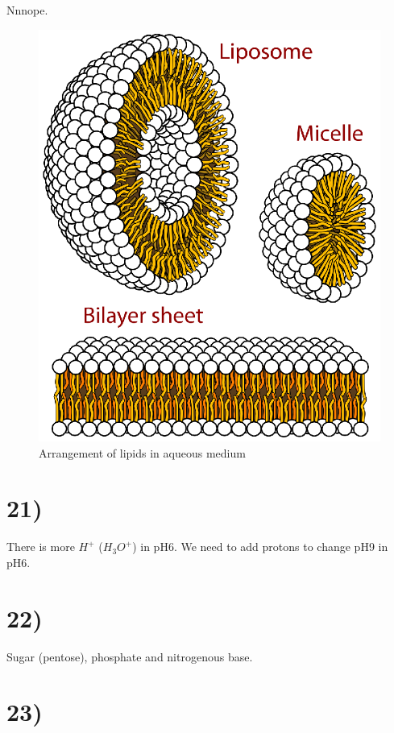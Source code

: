 Nnnope.
\begin{figure}[!ht]
    \centering
    \includegraphics[scale=0.5]{figures/lipids}
    \caption{Arrangement of lipids in aqueous medium}
\end{figure}

\FloatBarrier

\section*{21)}

There is more $H^+$ ($H_3O^+$) in pH6. We need to add protons to change pH9 in pH6.

\section*{22)}

Sugar (pentose), phosphate and nitrogenous base.

\section*{23)}

